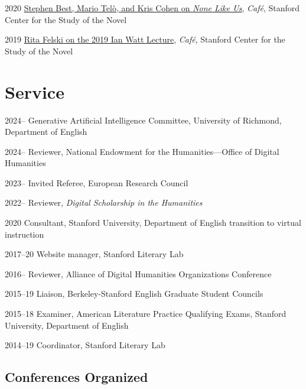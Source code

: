 \documentclass[12pt,letterpaper]{report}
\begin{document}
\begin{tablist}
	\item[2020] \tab{}\href{https://web.archive.org/web/20220429093211/https://novel.stanford.edu/csn-cafe/2021/7/23/books-at-the-center-stephen-best-mario-tel-and-kris-cohen-on-none-like-us-101019}{Stephen Best, Mario Telò, and Kris Cohen on \emph{None Like Us}}, \emph{Café}, Stanford Center for the Study of the Novel
	\item[2019] \tab{}\href{https://web.archive.org/web/20220429093144/https://novel.stanford.edu/csn-cafe/2021/7/23/rita-felski-on-her-2019-ian-watt-lecture-5319}{Rita Felski on the 2019 Ian Watt Lecture}, \emph{Café}, Stanford Center for the Study of the Novel
\end{tablist}

\section*{Service}

\begin{tablist}
	\item[2024--] \tab{}Generative Artificial Intelligence Committee, University of Richmond, Department of English
	\item[2024--] \tab{}Reviewer, National Endowment for the Humanities—Office of Digital Humanities
	\item[2023--] \tab{}Invited Referee, European Research Council
	\item[2022--] \tab{}Reviewer, \textit{Digital Scholarship in the Humanities}
	\item[2020] \tab{}Consultant, Stanford University, Department of English transition to virtual instruction
	\item[2017--20] \tab{}Website manager, Stanford Literary Lab
	\item[2016--] \tab{}Reviewer, Alliance of Digital Humanities Organizations Conference
	\item[2015--19] \tab{}Liaison, Berkeley-Stanford English Graduate Student Councils
	\item[2015--18] \tab{}Examiner, American Literature Practice Qualifying Exams, Stanford University, Department of English
	\item[2014--19] \tab{}Coordinator, Stanford Literary Lab
\end{tablist}

\subsection*{Conferences Organized}
\end{document}
